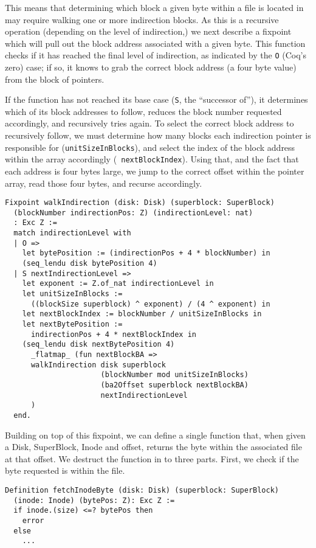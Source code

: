 \documentclass[nocopyrightspace]{sigplanconf}
\begin{document}
This means that determining which block a given byte within a file is located
in may require walking one or more indirection blocks. As this is a recursive
operation (depending on the level of indirection,) we next describe a fixpoint
which will pull out the block address associated with a given byte. This
function checks if it has reached the final level of indirection, as indicated
by the {\tt O} (Coq's zero) case; if so, it knows to grab the correct block
address (a four byte value) from the block of pointers.

If the function has not reached its base case ({\tt S}, the ``successor of''),
it determines which of its block addresses to follow, reduces the block number
requested accordingly, and recursively tries again. To select the correct
block address to recursively follow, we must determine how many blocks each
indirection pointer is responsible for ({\tt unitSizeInBlocks}), and select
the index of the block address within the array accordingly ({\tt
nextBlockIndex}). Using that, and the fact that each address is four bytes
large, we jump to the correct offset within the pointer array, read those four
bytes, and recurse accordingly.

\begin{lstlisting}
Fixpoint walkIndirection (disk: Disk) (superblock: SuperBlock)
  (blockNumber indirectionPos: Z) (indirectionLevel: nat) 
  : Exc Z :=
  match indirectionLevel with
  | O => 
    let bytePosition := (indirectionPos + 4 * blockNumber) in
    (seq_lendu disk bytePosition 4)
  | S nextIndirectionLevel =>
    let exponent := Z.of_nat indirectionLevel in
    let unitSizeInBlocks := 
      ((blockSize superblock) ^ exponent) / (4 ^ exponent) in
    let nextBlockIndex := blockNumber / unitSizeInBlocks in
    let nextBytePosition := 
      indirectionPos + 4 * nextBlockIndex in
    (seq_lendu disk nextBytePosition 4) 
      _flatmap_ (fun nextBlockBA =>
      walkIndirection disk superblock 
                      (blockNumber mod unitSizeInBlocks)
                      (ba2Offset superblock nextBlockBA)
                      nextIndirectionLevel
      )
  end.
\end{lstlisting}

Building on top of this fixpoint, we can define a single function that, when
given a Disk, SuperBlock, Inode and offset, returns the byte within the
associated file at that offset. We destruct the function in to three parts.
First, we check if the byte requested is within the file.

\begin{lstlisting}
Definition fetchInodeByte (disk: Disk) (superblock: SuperBlock)
  (inode: Inode) (bytePos: Z): Exc Z :=
  if inode.(size) <=? bytePos then 
    error
  else 
    ...
\end{lstlisting}
\end{document}

